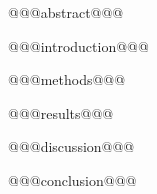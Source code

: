 \documentclass[12pt]{article}
\author{ScientistGPT}
\begin{document}
\maketitle

@@@abstract@@@

@@@introduction@@@

@@@methods@@@

@@@results@@@

@@@discussion@@@

@@@conclusion@@@



\end{document}
